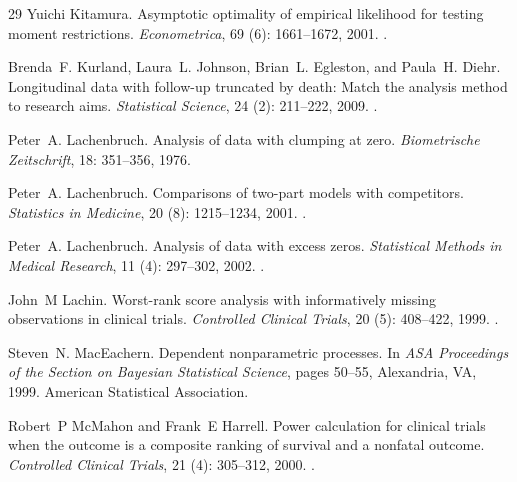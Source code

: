 \documentclass[11pt]{article}
\begin{document}
\begin{thebibliography}{29}
Yuichi Kitamura.
\newblock Asymptotic optimality of empirical likelihood for testing moment
  restrictions.
\newblock \emph{Econometrica}, 69 (6): 1661--1672, 2001.
\newblock {}.

Brenda~F. Kurland, Laura~L. Johnson, Brian~L. Egleston, and Paula~H. Diehr.
\newblock Longitudinal data with follow-up truncated by death: Match the
  analysis method to research aims.
\newblock \emph{Statistical Science}, 24 (2): 211--222, 2009.
\newblock {}.

Peter~A. Lachenbruch.
\newblock Analysis of data with clumping at zero.
\newblock \emph{Biometrische Zeitschrift}, 18: 351--356, 1976.

Peter~A. Lachenbruch.
\newblock Comparisons of two-part models with competitors.
\newblock \emph{Statistics in Medicine}, 20 (8): 1215--1234,
  2001.
\newblock {}.

Peter~A. Lachenbruch.
\newblock Analysis of data with excess zeros.
\newblock \emph{Statistical Methods in Medical Research}, 11
  (4): 297--302, 2002.
\newblock {}.

John~M Lachin.
\newblock Worst-rank score analysis with informatively missing observations in
  clinical trials.
\newblock \emph{Controlled Clinical Trials}, 20 (5):
  408--422, 1999.
\newblock {}.

Steven~N. MacEachern.
\newblock Dependent nonparametric processes.
\newblock In \emph{ASA Proceedings of the Section on Bayesian Statistical
  Science}, pages 50--55, Alexandria, VA, 1999. American Statistical
  Association.

Robert~P McMahon and Frank~E Harrell.
\newblock Power calculation for clinical trials when the outcome is a composite
  ranking of survival and a nonfatal outcome.
\newblock \emph{Controlled Clinical Trials}, 21 (4):
  305--312, 2000.
\newblock {}.


\end{thebibliography}
\end{document}
